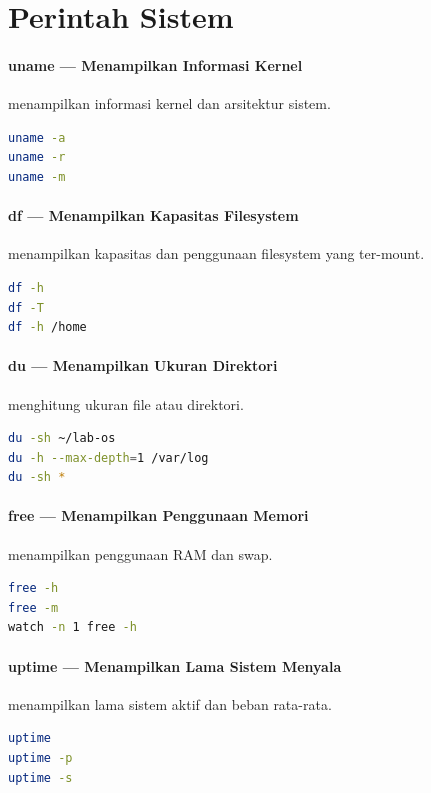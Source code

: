 \section{Perintah Sistem}

\paragraph*{uname --- Menampilkan Informasi Kernel}
 menampilkan informasi kernel dan arsitektur sistem.
\begin{lstlisting}[language=bash]
uname -a
uname -r
uname -m
\end{lstlisting}

\paragraph*{df --- Menampilkan Kapasitas Filesystem}
 menampilkan kapasitas dan penggunaan filesystem yang ter-mount.
\begin{lstlisting}[language=bash]
df -h
df -T
df -h /home
\end{lstlisting}

\paragraph*{du --- Menampilkan Ukuran Direktori}
 menghitung ukuran file atau direktori.
\begin{lstlisting}[language=bash]
du -sh ~/lab-os
du -h --max-depth=1 /var/log
du -sh *
\end{lstlisting}

\paragraph*{free --- Menampilkan Penggunaan Memori}
 menampilkan penggunaan RAM dan swap.
\begin{lstlisting}[language=bash]
free -h
free -m
watch -n 1 free -h
\end{lstlisting}

\paragraph*{uptime --- Menampilkan Lama Sistem Menyala}
 menampilkan lama sistem aktif dan beban rata-rata.
\begin{lstlisting}[language=bash]
uptime
uptime -p
uptime -s
\end{lstlisting}

